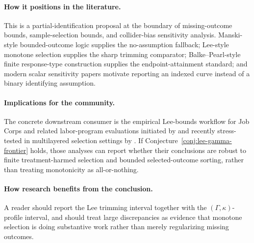 \documentclass[11pt]{article}
\theoremstyle{definition}
\theoremstyle{plain}
\theoremstyle{remark}
\begin{document}
\paragraph{How it positions in the literature.}
This is a partial-identification proposal at the boundary of missing-outcome bounds, sample-selection bounds, and collider-bias sensitivity analysis.  Manski-style bounded-outcome logic supplies the no-assumption fallback; Lee-style monotone selection supplies the sharp trimming comparator; Balke--Pearl-style finite response-type construction supplies the endpoint-attainment standard; and modern scalar sensitivity papers motivate reporting an indexed curve instead of a binary identifying assumption.

\paragraph{Implications for the community.}
The concrete downstream consumer is the empirical Lee-bounds workflow for Job Corps and related labor-program evaluations initiated by \citet{Lee2009SampleSelection} and recently stress-tested in multilayered selection settings by \citet{KroftMourifieVayalinkal2024MultilayeredLee}.  If Conjecture~\ref{conj:lee-gamma-frontier} holds, those analyses can report whether their conclusions are robust to finite treatment-harmed selection and bounded selected-outcome sorting, rather than treating monotonicity as all-or-nothing.

\paragraph{How research benefits from the conclusion.}
A reader should report the Lee trimming interval together with the \((\Gamma,\kappa)\)-profile interval, and should treat large discrepancies as evidence that monotone selection is doing substantive work rather than merely regularizing missing outcomes.
\end{document}

